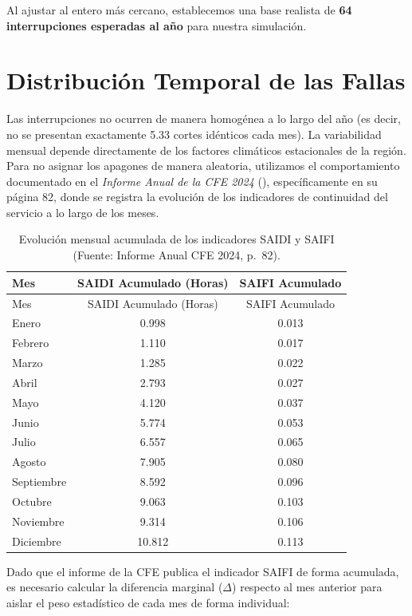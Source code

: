 \documentclass[
  spanish,
  letterpaper,
  DIV=11,
  numbers=noendperiod]{scrreprt}
\theoremstyle{plain}
\theoremstyle{definition}
\theoremstyle{remark}
\begin{document}
Al ajustar al entero más cercano, establecemos una base realista de
\textbf{64 interrupciones esperadas al año} para nuestra simulación.

\section{Distribución Temporal de las
Fallas}\label{distribuciuxf3n-temporal-de-las-fallas}

Las interrupciones no ocurren de manera homogénea a lo largo del año (es
decir, no se presentan exactamente 5.33 cortes idénticos cada mes). La
variabilidad mensual depende directamente de los factores climáticos
estacionales de la región. Para no asignar los apagones de manera
aleatoria, utilizamos el comportamiento documentado en el \emph{Informe
Anual de la CFE 2024} (), específicamente en su página 82, donde se registra
la evolución de los indicadores de continuidad del servicio a lo largo
de los meses.

\begin{longtable}[]{@{}lcc@{}}
\caption{Evolución mensual acumulada de los indicadores SAIDI y SAIFI
(Fuente: Informe Anual CFE 2024,
p.~82).}\label{tbl-saidi-saifi}\tabularnewline
\toprule\noalign{}
Mes & SAIDI Acumulado (Horas) & SAIFI Acumulado \\
\midrule\noalign{}
\endfirsthead
\toprule\noalign{}
Mes & SAIDI Acumulado (Horas) & SAIFI Acumulado \\
\midrule\noalign{}
\endhead
\bottomrule\noalign{}
\endlastfoot
Enero & 0.998 & 0.013 \\
Febrero & 1.110 & 0.017 \\
Marzo & 1.285 & 0.022 \\
Abril & 2.793 & 0.027 \\
Mayo & 4.120 & 0.037 \\
Junio & 5.774 & 0.053 \\
Julio & 6.557 & 0.065 \\
Agosto & 7.905 & 0.080 \\
Septiembre & 8.592 & 0.096 \\
Octubre & 9.063 & 0.103 \\
Noviembre & 9.314 & 0.106 \\
Diciembre & 10.812 & 0.113 \\
\end{longtable}

Dado que el informe de la CFE publica el indicador SAIFI de forma
acumulada, es necesario calcular la diferencia marginal (\(\Delta\))
respecto al mes anterior para aislar el peso estadístico de cada mes de
forma individual:
\end{document}
